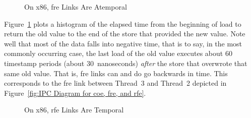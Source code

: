\documentclass[10]{article}
\begin{document}
\begin{figure}[tb]
\begin{center}
\caption{On x86, fre Links Are Atemporal}
\label{fig:On x86, fre Links Are Atemporal}
\end{center}
\end{figure}

Figure~\ref{fig:On x86, fre Links Are Atemporal}
plots a histogram of the elapsed time from the beginning of load to
return the old value to the end of the store that provided the new value.
Note well that most of the data falls into negative time, that is to
say, in the most commonly occurring case, the last load of the old value
executes about 60 timestamp periods (about 30~nanoseconds) \emph{after}
the store that overwrote that same old value.
That is, fre links can and do go backwards in time.
This corresponds to the fre link between Thread~3 and Thread~2 depicted in
Figure~\ref{fig:IPC Diagram for coe, fre, and rfe}.

\begin{figure}[tb]
\begin{center}
\caption{On x86, rfe Links Are Temporal}
\label{fig:On x86, rfe Links Are Temporal}
\end{center}
\end{figure}
\end{document}
